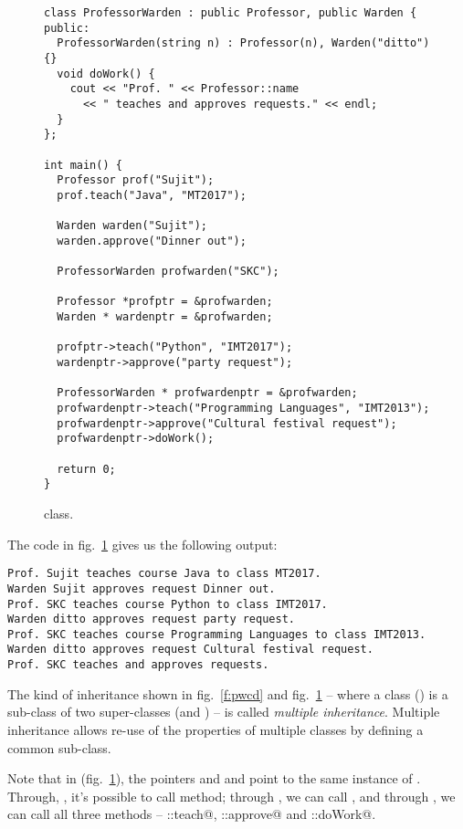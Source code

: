 \documentclass[12pt,a4paper]{article}
\begin{document}
\begin{figure}[H]
\begin{lstlisting}[frame=single]
class ProfessorWarden : public Professor, public Warden {
public:
  ProfessorWarden(string n) : Professor(n), Warden("ditto") {}
  void doWork() {
    cout << "Prof. " << Professor::name
      << " teaches and approves requests." << endl;
  }
};

int main() {
  Professor prof("Sujit");
  prof.teach("Java", "MT2017");

  Warden warden("Sujit");
  warden.approve("Dinner out");

  ProfessorWarden profwarden("SKC");
  
  Professor *profptr = &profwarden;
  Warden * wardenptr = &profwarden;

  profptr->teach("Python", "IMT2017");
  wardenptr->approve("party request");

  ProfessorWarden * profwardenptr = &profwarden;
  profwardenptr->teach("Programming Languages", "IMT2013");
  profwardenptr->approve("Cultural festival request");
  profwardenptr->doWork();

  return 0;
}
\end{lstlisting}
\caption{\lstinline@ProfessorWarden@ class.}
\label{f:ins3}
\end{figure}

The code in fig.~\ref{f:ins3} gives us the following output:

\begin{lstlisting}[frame=single]
Prof. Sujit teaches course Java to class MT2017.
Warden Sujit approves request Dinner out.
Prof. SKC teaches course Python to class IMT2017.
Warden ditto approves request party request.
Prof. SKC teaches course Programming Languages to class IMT2013.
Warden ditto approves request Cultural festival request.
Prof. SKC teaches and approves requests.
\end{lstlisting}

The kind of inheritance shown in fig.~\ref{f:pwcd} and  fig.~\ref{f:ins3} -- where a class (\lstinline@ProfessorWarden@) is a sub-class of two super-classes (\lstinline@Professor@ and \lstinline@Warden@) -- is called \emph{multiple inheritance}. Multiple inheritance allows re-use of the properties of multiple classes by defining a common sub-class.
 
Note that in \lstinline@main@(fig.~\ref{f:ins3}), the pointers \lstinline@profptr@ and \lstinline@wardenptr@ and \lstinline@profwardenptr@ point to the same instance of \lstinline@ProfessorWarden@. Through, \lstinline@profptr@, it's possible to call \lstinline@teach@ method; through \lstinline@wardenptr@, we can call \lstinline@approve@, and through \lstinline@profwardenptr@, we can call all three methods -- \lstinline@Professor::teach@, \lstinline@Warden::approve@ and \lstinline@ProfessorWarden::doWork@.
 
\end{document}
